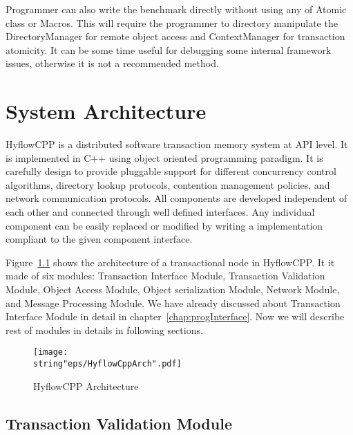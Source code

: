 \documentclass[12pt,english]{report}
\begin{document}
Programmer can also write the benchmark directly without using any of Atomic class or Macros. This will require the programmer to directory manipulate the DirectoryManager for remote object access and ContextManager for transaction atomicity. It can be some time useful for debugging some internal framework issues, otherwise it is not a recommended method. 


\chapter{System Architecture}\label{chap:sysArch}

HyflowCPP is a distributed software transaction memory system at API level. It is implemented in C++ using object oriented programming paradigm. It is carefully design to provide pluggable support for different concurrency control algorithms, directory lookup protocols, contention management policies, and network communication protocols. All components are developed independent of each other and connected through well defined interfaces. Any individual component can be easily replaced or modified by writing a implementation compliant to the given component interface. 

Figure~\ref{Fig:HyflowCppArch} shows the architecture of a transactional node in HyflowCPP. It it made of six modules: Transaction Interface Module, Transaction Validation Module, Object Access Module, Object serialization Module, Network Module, and Message Processing Module. We have already discussed about Transaction Interface Module in detail in chapter~\ref{chap:progInterface}. Now we will describe rest of modules in details in following sections.

\begin{figure}
\begin{minipage}[b]{0.9\linewidth}\centering
\centering \texttt{[image: \\string"eps/HyflowCppArch".pdf]}
\caption{HyflowCPP Architecture}
\label{Fig:HyflowCppArch}
\end{minipage}
\end{figure}

\section{Transaction Validation Module}
\end{document}
